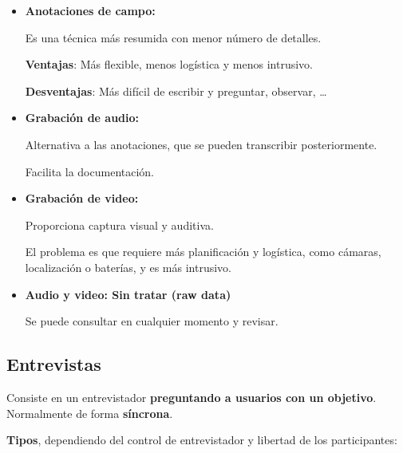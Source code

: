 \documentclass[12pt, twoside, openright]{report} %
\begin{document}
\begin{itemize}
	\item \textbf{Anotaciones de campo:}

	      Es una técnica más resumida con menor número de detalles.

	      \textbf{Ventajas}: Más flexible, menos logística y menos intrusivo.

	      \textbf{Desventajas}: Más difícil de escribir y preguntar, observar,
	      \ldots{}
	\item \textbf{Grabación de audio:}

	      Alternativa a las anotaciones, que se pueden transcribir
	      posteriormente.

	      Facilita la documentación.
	\item \textbf{Grabación de video:}

	      Proporciona captura visual y auditiva.

	      El problema es que requiere más planificación y logística, como
	      cámaras, localización o baterías, y es más intrusivo.
	\item \textbf{Audio y video: Sin tratar (raw data)}

	      Se puede consultar en cualquier momento y revisar.
\end{itemize}

\subsection{Entrevistas}

Consiste en un entrevistador \textbf{preguntando a usuarios con un
	objetivo}. Normalmente de forma \textbf{síncrona}.

\textbf{Tipos}, dependiendo del control de entrevistador y libertad de
los participantes:
\end{document}
